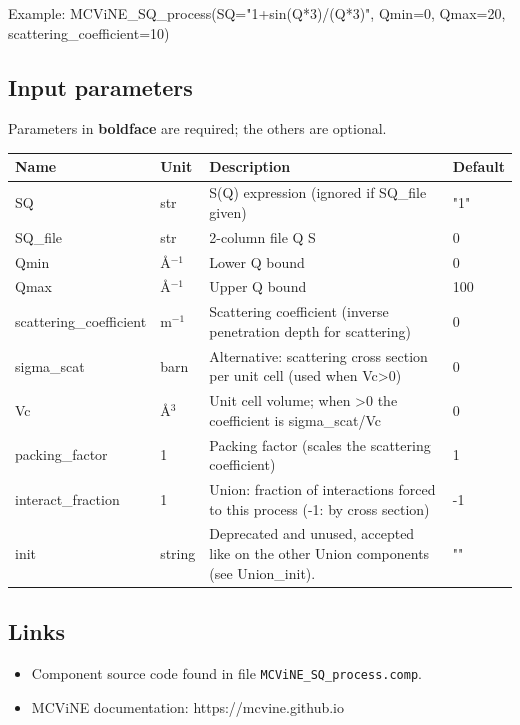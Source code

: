 Example: MCViNE\_SQ\_process(SQ="1+sin(Q*3)/(Q*3)", Qmin=0, Qmax=20, scattering\_coefficient=10)

\subsection*{Input parameters}
Parameters in \textbf{boldface} are required; the others are optional.

\begin{longtable}{p{}p{}p{}p{}}
\toprule
\textbf{Name} & \textbf{Unit} & \textbf{Description} & \textbf{Default} \\
\midrule
\endhead
SQ & str & S(Q) expression (ignored if SQ\_file given) & "1" \\
SQ\_file & str & 2-column file Q S & 0 \\
Qmin & \AA{}$^{-1}$ & Lower Q bound & 0 \\
Qmax & \AA{}$^{-1}$ & Upper Q bound & 100 \\
scattering\_coefficient & m$^{-1}$ & Scattering coefficient (inverse penetration depth for scattering) & 0 \\
sigma\_scat & barn & Alternative: scattering cross section per unit cell (used when Vc\textgreater{}0) & 0 \\
Vc & \AA{}$^{3}$ & Unit cell volume; when \textgreater{}0 the coefficient is sigma\_scat/Vc & 0 \\
packing\_factor & 1 & Packing factor (scales the scattering coefficient) & 1 \\
interact\_fraction & 1 & Union: fraction of interactions forced to this process (-1: by cross section) & -1 \\
init & string & Deprecated and unused, accepted like on the other Union components (see Union\_init). & "" \\
\bottomrule
\end{longtable}

\subsection*{Links}
\begin{itemize}
  \item Component source code found in file \texttt{MCViNE\_SQ\_process.comp}.
  \item MCViNE documentation: https://mcvine.github.io
\end{itemize}
